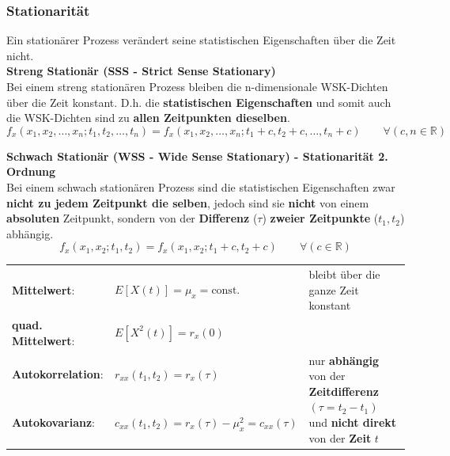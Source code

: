 \subsubsection{Stationarität}
Ein stationärer Prozess verändert seine statistischen Eigenschaften über die Zeit nicht. \\

\textbf{Streng Stationär (SSS - Strict Sense Stationary)}\\
Bei einem streng stationären Prozess bleiben die n-dimensionale WSK-Dichten über die
Zeit konstant. D.h. die \textbf{statistischen Eigenschaften} und somit auch die WSK-Dichten sind zu 
\textbf{allen Zeitpunkten dieselben}.
$$ f_x(x_1, x_2, \ldots, x_n; t_1, t_2, \ldots, t_n) =
		f_x(x_1, x_2, \ldots, x_n; t_1+c, t_2+c, \ldots, t_n+c) \qquad \forall (c,n \in
		\mathbb{R})$$

\textbf{Schwach Stationär (WSS - Wide Sense Stationary) - Stationarität 2. Ordnung}\\
Bei einem schwach stationären Prozess sind die statistischen Eigenschaften zwar
\textbf{nicht zu jedem Zeitpunkt die selben}, jedoch sind sie \textbf{nicht} von einem \textbf{absoluten} Zeitpunkt, sondern
von der \textbf{Differenz} ($\tau$) \textbf{zweier Zeitpunkte} ($t_1, t_2$) abhängig.  \\ 
$$ f_x(x_1, x_2; t_1, t_2) = f_x(x_1, x_2; t_1+c, t_2+c) \qquad \forall (c \in
		\mathbb{R})$$
\renewcommand{\arraystretch}{1.4}
\begin{tabular}[c]{ p{3.3cm}  p{6.5cm} p{8cm} }
	\textbf{Mittelwert}: 	&  $E[X(t)] = \mu_{x} = \text{const.}$  
							& bleibt über die ganze Zeit konstant\\ 
	\textbf{quad. Mittelwert}: 	&  $E[X^{2}(t)] = r_{x}(0)$  \\ 
	\textbf{Autokorrelation}: 	& 	$r_{xx}(t_{1},t_{2}) = r_{x}(\tau)$
	& \multirow{2}{8cm}{nur \textbf{abhängig} von der \textbf{Zeitdifferenz} $(\tau = t_2 - t_1)$ und \textbf{nicht direkt} von
	 der \textbf{Zeit} $t$} \\
	 \textbf{Autokovarianz}:		& $ c_{xx}(t_{1},t_{2}) = r_{x}(\tau) - \mu_{x}^{2} = c_{xx}(\tau)$ \\
\end{tabular}
\renewcommand{\arraystretch}{1}
 
